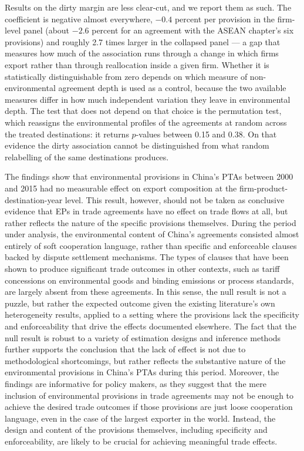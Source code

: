 \documentclass[12pt]{article}
\begin{document}
Results on the dirty margin are less clear-cut, and we report them as such. The coefficient is negative almost everywhere, $-0.4$ percent per provision in the firm-level panel (about $-2.6$ percent for an agreement with the ASEAN chapter's six provisions) and roughly 2.7 times larger in the collapsed panel --- a gap that measures how much of the association runs through a change in which firms export rather than through reallocation inside a given firm. Whether it is statistically distinguishable from zero depends on which measure of non-environmental agreement depth is used as a control, because the two available measures differ in how much independent variation they leave in environmental depth. The test that does not depend on that choice is the permutation test, which reassigns the environmental profiles of the agreements at random across the treated destinations: it returns $p$-values between 0.15 and 0.38. On that evidence the dirty association cannot be distinguished from what random relabelling of the same destinations produces.

The findings show that environmental provisions in China's PTAs between 2000 and 2015 had no measurable effect on export composition at the firm-product-destination-year level. This result, however, should not be taken as conclusive evidence that EPs in trade agreements have no effect on trade flows at all, but rather reflects the nature of the specific provisions themselves. During the period under analysis, the environmental content of China's agreements consisted almost entirely of soft cooperation language, rather than specific and enforceable clauses backed by dispute settlement mechanisms. The types of clauses that have been shown to produce significant trade outcomes in other contexts, such as tariff concessions on environmental goods and binding emissions or process standards, are largely absent from these agreements. In this sense, the null result is not a puzzle, but rather the expected outcome given the existing literature's own heterogeneity results, applied to a setting where the provisions lack the specificity and enforceability that drive the effects documented elsewhere. The fact that the null result is robust to a variety of estimation designs and inference methods further supports the conclusion that the lack of effect is not due to methodological shortcomings, but rather reflects the substantive nature of the environmental provisions in China's PTAs during this period. Moreover, the findings are informative for policy makers, as they suggest that the mere inclusion of environmental provisions in trade agreements may not be enough to achieve the desired trade outcomes if those provisions are just loose cooperation language, even in the case of the largest exporter in the world. Instead, the design and content of the provisions themselves, including specificity and enforceability, are likely to be crucial for achieving meaningful trade effects.
\end{document}
